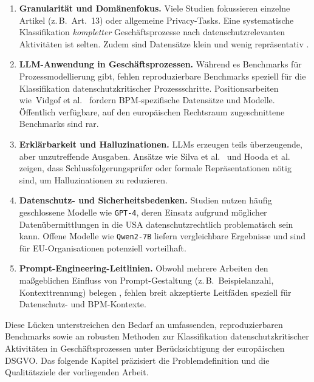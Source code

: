 \begin{enumerate}
    \item \textbf{Granularität und Domänenfokus.} Viele Studien fokussieren einzelne Artikel (z.\,B.\ Art.~13) oder allgemeine Privacy-Tasks. Eine systematische Klassifikation \emph{kompletter} Geschäftsprozesse nach datenschutzrelevanten Aktivitäten ist selten. Zudem sind Datensätze klein und wenig repräsentativ \cite{nake2023towards}.
    \item \textbf{\ac{LLM}-Anwendung in Geschäftsprozessen.} Während es Benchmarks für Prozessmodellierung gibt, fehlen reproduzierbare Benchmarks speziell für die Klassifikation datenschutzkritischer Prozessschritte. Positionsarbeiten wie\linebreak~Vidgof et al.\ \cite{vidgof2023largelanguagemodelsbusiness} fordern \ac{BPM}-spezifische Datensätze und Modelle. Öffentlich verfügbare, auf den europäischen Rechtsraum zugeschnittene Benchmarks sind rar.
    \item \textbf{Erklärbarkeit und Halluzinationen.} \acp{LLM} erzeugen teils überzeugende, aber unzutreffende Ausgaben. Ansätze wie Silva et al.\ \cite{silva2024entailment} und Hooda et al.\ \cite{hooda2024policylr} zeigen, dass Schlussfolgerungsprüfer oder formale Repräsentationen nötig sind, um Halluzinationen zu reduzieren.
    \item \textbf{Datenschutz- und Sicherheitsbedenken.} Studien nutzen häufig geschlossene Modelle wie \texttt{GPT-4}, deren Einsatz aufgrund möglicher Datenübermittlungen in die USA datenschutzrechtlich problematisch sein kann. Offene Modelle wie \texttt{Qwen2-7B} liefern vergleichbare Ergebnisse \cite{schwerin2024systematic} und sind für \ac{EU}-Organisationen potenziell vorteilhaft.
    \item \textbf{Prompt-Engineering-Leitlinien.} Obwohl mehrere Arbeiten den maßgeblichen Einfluss von Prompt-Gestaltung (z.\,B.\ Beispielanzahl, Kontexttrennung) belegen \cite{liu2023prompting,pragyan2024toward}, fehlen breit akzeptierte Leitfäden speziell für Datenschutz- und \ac{BPM}-Kontexte.
\end{enumerate}

Diese Lücken unterstreichen den Bedarf an umfassenden, reproduzierbaren Benchmarks sowie an robusten Methoden zur Klassifikation datenschutzkritischer Aktivitäten in Geschäftsprozessen unter Berücksichtigung der europäischen \ac{DSGVO}. Das folgende Kapitel präzisiert die Problemdefinition und die Qualitätsziele der vorliegenden Arbeit.
